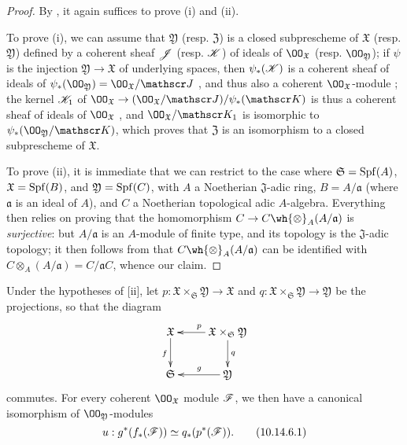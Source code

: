 \begin{proof}
\label{proof-1.10.14.5}
By , it again suffices to prove (i) and (ii).

To prove (i), we can assume that $\mathfrak{Y}$ (resp. $\mathfrak{Z}$) is a closed subprescheme of $\mathfrak{X}$ (resp. $\mathfrak{Y}$) defined by a coherent sheaf $\mathscr{J}$ (resp. $\mathscr{K}$) of ideals of $\OO_\mathfrak{X}$ (resp. $\OO_\mathfrak{Y}$);
if $\psi$ is the injection $\mathfrak{Y}\to\mathfrak{X}$ of underlying spaces, then $\psi_*(\mathscr{K})$ is a coherent sheaf of ideals of $\psi_*(\OO_\mathfrak{Y})=\OO_\mathfrak{X}/\sh{J}$ , and thus also a coherent $\OO_\mathfrak{X}$-module ;
the kernel $\mathscr{K}_1$ of $\OO_\mathfrak{X}\to(\OO_\mathfrak{X}/\sh{J})/\psi_*(\sh{K})$ is thus a coherent sheaf of ideals of $\OO_\mathfrak{X}$ , and $\OO_\mathfrak{X}/\sh{K}_1$ is isomorphic to $\psi_*(\OO_\mathfrak{Y}/\sh{K})$, which proves that $\mathfrak{Z}$ is an isomorphism to a closed subprescheme of $\mathfrak{X}$.

To prove (ii), it is immediate that we can restrict to the case where $\mathfrak{S}=\operatorname{Spf}(A)$, $\mathfrak{X}=\operatorname{Spf}(B)$, and $\mathfrak{Y}=\operatorname{Spf}(C)$, with $A$ a Noetherian $\mathfrak{J}$-adic ring, $B=A/\mathfrak{a}$ (where $\mathfrak{a}$ is an ideal of $A$), and $C$ a Noetherian topological adic $A$-algebra.
Everything then relies on proving that the homomorphism $C\to C\wh{\otimes}_A(A/\mathfrak{a})$ is \emph{surjective}:
but $A/\mathfrak{a}$ is an $A$-module of finite type, and its topology is the $\mathfrak{J}$-adic topology;
it then follows from  that $C\wh{\otimes}_A(A/\mathfrak{a})$ can be identified with $C\otimes_A(A/\mathfrak{a})=C/\mathfrak{a}C$, whence our claim.
\end{proof}

\begin{cor}[10.14.6]
\label{1.10.14.6}
Under the hypotheses of [ii], let $p:\mathfrak{X}\times_\mathfrak{S}\mathfrak{Y}\to\mathfrak{X}$ and $q:\mathfrak{X}\times_\mathfrak{S}\mathfrak{Y}\to\mathfrak{Y}$ be the projections, so that the diagram
\[
  \xymatrix{
    \mathfrak{X}\ar[d]_f &
    \mathfrak{X}\times_\mathfrak{S}\mathfrak{Y}\ar[l]_p\ar[d]^q\\
    \mathfrak{S} &
    \mathfrak{Y}\ar[l]_g
  }
\]
commutes.
For every coherent $\OO_\mathfrak{X}$ module $\mathscr{F}$, we then have a canonical isomorphism of $\OO_\mathfrak{Y}$-modules
\begin{equation*}
\label{1.10.14.6.1}
  u:g^*(f_*(\mathscr{F}))\simeq q_*(p^*(\mathscr{F})).
  \tag{10.14.6.1}
\end{equation*}
\end{cor}

